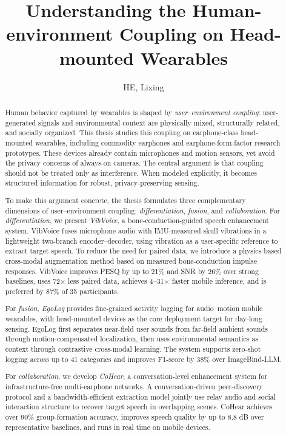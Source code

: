 \documentclass[11pt]{gsasthesis} %
\title{Understanding the Human-environment
Coupling on Head-mounted Wearables} %
\author{HE, Lixing} %
\begin{document}


\thesistitlepage
\begin{abstract}
Human behavior captured by wearables is shaped by \textit{user--environment coupling}: user-generated signals and environmental context are physically mixed, structurally related, and socially organized. This thesis studies this coupling on earphone-class head-mounted wearables, including commodity earphones and earphone-form-factor research prototypes. These devices already contain microphones and motion sensors, yet avoid the privacy concerns of always-on cameras. The central argument is that coupling should not be treated only as interference. When modeled explicitly, it becomes structured information for robust, privacy-preserving sensing.

To make this argument concrete, the thesis formulates three complementary dimensions of user--environment coupling: \textit{differentiation}, \textit{fusion}, and \textit{collaboration}. For \textit{differentiation}, we present \textit{VibVoice}, a bone-conduction-guided speech enhancement system. VibVoice fuses microphone audio with IMU-measured skull vibrations in a lightweight two-branch encoder--decoder, using vibration as a user-specific reference to extract target speech. To reduce the need for paired data, we introduce a physics-based cross-modal augmentation method based on measured bone-conduction impulse responses. VibVoice improves PESQ by up to 21\% and SNR by 26\% over strong baselines, uses 72$\times$ less paired data, achieves 4--31$\times$ faster mobile inference, and is preferred by 87\% of 35 participants.

For \textit{fusion}, \textit{EgoLog} provides fine-grained activity logging for audio--motion mobile wearables, with head-mounted devices as the core deployment target for day-long sensing. EgoLog first separates near-field user sounds from far-field ambient sounds through motion-compensated localization, then uses environmental semantics as context through contrastive cross-modal learning. The system supports zero-shot logging across up to 41 categories and improves F1-score by 38\% over ImageBind-LLM.

For \textit{collaboration}, we develop \textit{CoHear}, a conversation-level enhancement system for infrastructure-free multi-earphone networks. A conversation-driven peer-discovery protocol and a bandwidth-efficient extraction model jointly use relay audio and social interaction structure to recover target speech in overlapping scenes. CoHear achieves over 90\% group-formation accuracy, improves speech quality by up to 8.8 dB over representative baselines, and runs in real time on mobile devices.


\end{abstract}
\end{document}
